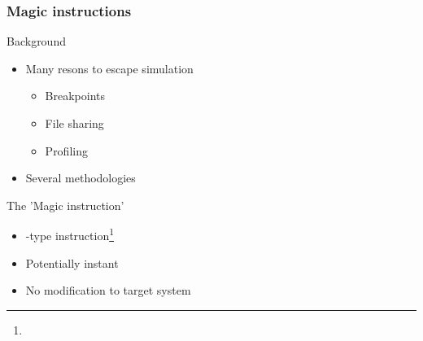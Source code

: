 
\begin{frame}
\frametitle{Magic instructions}

\begin{block}{Background}
	\begin{itemize}
		\item Many resons to escape simulation
		\begin{itemize}
			\item Breakpoints
			\item File sharing
			\item Profiling
		\end{itemize}
		\item Several methodologies
	\end{itemize}
\end{block}

\begin{block}{The 'Magic instruction'}
	\begin{itemize}
	\item {}-type instruction\footnote{}
	\item Potentially instant
	\item No modification to target system
\end{itemize}
\end{block}

\end{frame}
